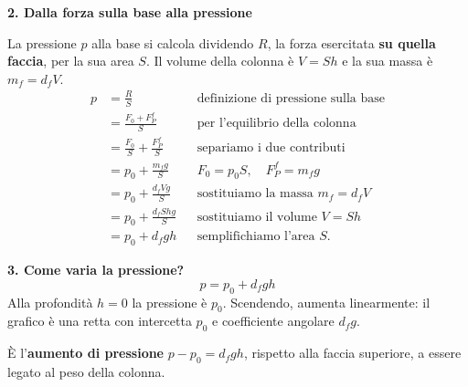 \documentclass[11pt,a4paper]{article}
\begin{document}
\vspace{6pt}
{\large\bfseries 2. Dalla forza sulla base alla pressione}

La pressione $p$ alla base si calcola dividendo $R$, la forza esercitata
\textbf{su quella faccia}, per la sua area $S$.
Il volume della colonna è $V=Sh$ e la sua massa è $m_f=d_fV$.
\begin{align*}
 p &= \frac{R}{S}
 && \text{definizione di pressione sulla base}\\[3pt]
   &= \frac{F_0+F_P^{f}}{S}
 && \text{per l'equilibrio della colonna}\\[3pt]
   &= \frac{F_0}{S}+\frac{F_P^{f}}{S}
 && \text{separiamo i due contributi}\\[3pt]
   &= p_0+\frac{m_fg}{S}
 && F_0=p_0S,\quad F_P^{f}=m_fg\\[3pt]
   &= p_0+\frac{d_fVg}{S}
 && \text{sostituiamo la massa }m_f=d_fV\\[3pt]
   &= p_0+\frac{d_fShg}{S}
 && \text{sostituiamo il volume }V=Sh\\[3pt]
   &= p_0+d_fgh
 && \text{semplifichiamo l'area }S.
\end{align*}

\vspace{5pt}
\begin{minipage}[c]{0.57\textwidth}
{\large\bfseries 3. Come varia la pressione?}
\[
  \boxed{\;p=p_0+d_fgh\;}
\]
Alla profondità $h=0$ la pressione è $p_0$.
Scendendo, aumenta linearmente: il grafico è una retta
con intercetta $p_0$ e coefficiente angolare $d_fg$.

È l'\textbf{aumento di pressione} $p-p_0=d_fgh$, rispetto alla faccia
superiore, a essere legato al peso della colonna.
\end{minipage}\hfill
\begin{minipage}[c]{0.39\textwidth}
\centering
{}
\end{minipage}
\end{document}
